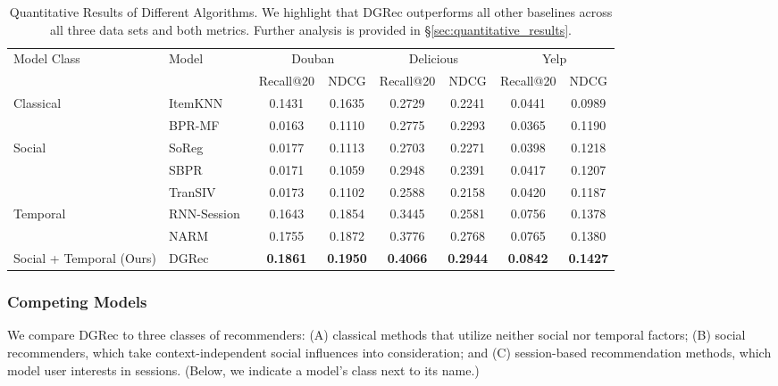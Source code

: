 \documentclass[sigconf]{acmart}
\begin{document}
\begin{table*}
\centering
\begin{tabular}{llcccccc}
\toprule \multirow{2}{*}{Model Class} & \multirow{2}{*}{Model} & \multicolumn{2}{c}{Douban} & \multicolumn{2}{c}{Delicious} & \multicolumn{2}{c}{Yelp} \\
& & Recall@20 & NDCG & Recall@20 & NDCG & Recall@20 & NDCG \\
\midrule \multirow{2}{*}{Classical} & ItemKNN~\cite{linden2003amazon} & 0.1431 & 0.1635 & 0.2729 & 0.2241 & 0.0441 & 0.0989 \\
 & BPR-MF~\cite{rendle2009bpr} & 0.0163 & 0.1110 & 0.2775 & 0.2293 & 0.0365 & 0.1190 \\
 \midrule \multirow{3}{*}{Social} & SoReg~\cite{ma2011recommender} & 0.0177 & 0.1113 &0.2703 & 0.2271 & 0.0398 & 0.1218 \\ 
& SBPR~\cite{zhao2014leveraging} & 0.0171 & 0.1059 & 0.2948 & 0.2391 & 0.0417 & 0.1207\\
& TranSIV~\cite{xiao2017learning} & 0.0173 & 0.1102 & 0.2588 & 0.2158 & 0.0420 & 0.1187 \\
\midrule \multirow{2}{*}{Temporal} & RNN-Session~\cite{hidasi2016session} & 0.1643 & 0.1854 & 0.3445 & 0.2581 & 0.0756 & 0.1378 \\
& NARM~\cite{li2017neural} &0.1755 &0.1872 &0.3776 &0.2768 &0.0765 & 0.1380 \\
\midrule Social + Temporal (Ours) & DGRec & \textbf{0.1861} & \textbf{0.1950} & \textbf{0.4066} & \textbf{0.2944} & \textbf{0.0842} & \textbf{0.1427} \\
\bottomrule \end{tabular}
\caption{Quantitative Results of Different Algorithms. We highlight that \gls{DGRec} outperforms all other baselines across all three data sets and both metrics. Further analysis is provided in \S \ref{sec:quantitative_results}.}
\vspace{-10pt}
\label{table:results}
\end{table*}




\subsubsection{Competing Models}\label{sec:models}

We compare \gls{DGRec} to three classes of recommenders: (A) classical methods that utilize neither social nor temporal factors; (B) social recommenders, which take context-independent social influences into consideration; and (C) session-based recommendation methods, which model user interests in sessions. (Below, we indicate a model's class next to its name.)
\end{document}
